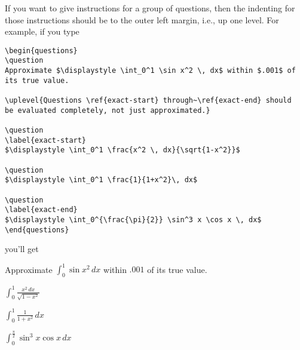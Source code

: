 \documentclass[12pt]{exam}
\begin{document}
\bigskip
If you want to give instructions for a group of questions, then the
indenting for those instructions should be to the outer left margin,
i.e., up one level.  For example, if you type
%
\begin{verbatim}
\begin{questions}
\question
Approximate $\displaystyle \int_0^1 \sin x^2 \, dx$ within $.001$ of
its true value.

\uplevel{Questions \ref{exact-start} through~\ref{exact-end} should
be evaluated completely, not just approximated.}

\question
\label{exact-start}
$\displaystyle \int_0^1 \frac{x^2 \, dx}{\sqrt{1-x^2}}$

\question
$\displaystyle \int_0^1 \frac{1}{1+x^2}\, dx$

\question
\label{exact-end}
$\displaystyle \int_0^{\frac{\pi}{2}} \sin^3 x \cos x \, dx$
\end{questions}
\end{verbatim}
%
you'll get
\begin{questions}
\question
Approximate $\displaystyle \int_0^1 \sin x^2 \, dx$ within $.001$ of
its true value.


\question
\label{exact-start}
$\displaystyle \int_0^1 \frac{x^2 \, dx}{\sqrt{1-x^2}}$

\question
$\displaystyle \int_0^1 \frac{1}{1+x^2}\, dx$

\question
\label{exact-end}
$\displaystyle \int_0^{\frac{\pi}{2}} \sin^3 x \cos x \, dx$
\end{questions}
\end{document}
